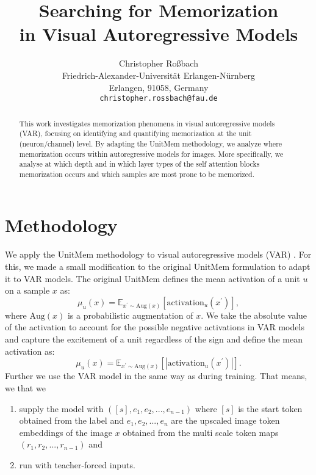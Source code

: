 \documentclass{article} %
\title{Searching for Memorization\\in Visual Autoregressive Models}
\author{Christopher Roßbach\\
Friedrich-Alexander-Universität Erlangen-Nürnberg \\
Erlangen, 91058, Germany \\
\texttt{christopher.rossbach@fau.de}}
\begin{document}
\maketitle

\begin{abstract}
This work investigates memorization phenomena in visual autoregressive models (VAR), focusing on identifying and quantifying memorization at the unit (neuron/channel) level.
By adapting the UnitMem methodology, we analyze where memorization occurs within autoregressive models for images.
More specifically, we analyse at which depth and in which layer types of the self attention blocks memorization occurs and which samples are most prone to be memorized.
\end{abstract}
\section{Methodology}
We apply the UnitMem methodology \citep{wangLocalizingMemorizationSSL2024} to visual autoregressive models (VAR) \citep{tianVisualAutoregressiveModeling2024}.
For this, we made a small modification to the original UnitMem formulation to adapt it to VAR models.
The original UnitMem defines the mean activation of a unit $u$ on a sample $x$ as:
\begin{equation}
    \mu_u(x) = \mathbb{E}_{x^\prime\sim\text{Aug}(x)}[\text{activation}_u(x^\prime)],
\end{equation}
where $\text{Aug}(x)$ is a probabilistic augmentation of $x$.
We take the absolute value of the activation to account for the possible negative activations in VAR models and capture the excitement of a unit regardless of the sign and define the mean activation as:
\begin{equation}
   \label{eq:activation_mean}
    \mu_u(x) = \mathbb{E}_{x^\prime\sim\text{Aug}(x)}[|\text{activation}_u(x^\prime)|].
\end{equation}
Further we use the VAR model in the same way as during training.
That means, we that we
\begin{enumerate}
   \item supply the model with $([s], e_1, e_2, ..., e_{n-1})$ where $[s]$ is the start token obtained from the label and $e_1, e_2, ..., e_{n}$ are the upscaled image token embeddings of the image $x$ obtained from the multi scale token maps $(r_1, r_2, ..., r_{n-1})$ and 
   \item run with teacher-forced inputs.
\end{enumerate}
\end{document}
